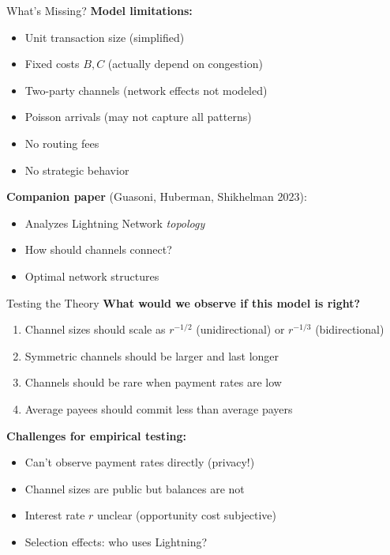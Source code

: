 \documentclass[aspectratio=169,12pt]{beamer}
\begin{document}
\begin{frame}{What's Missing?}
\textbf{Model limitations:}
\begin{itemize}
    \item Unit transaction size (simplified)
    \item Fixed costs $B, C$ (actually depend on congestion)
    \item Two-party channels (network effects not modeled)
    \item Poisson arrivals (may not capture all patterns)
    \item No routing fees
    \item No strategic behavior
\end{itemize}

\vspace{0.5cm}
\textbf{Companion paper} (Guasoni, Huberman, Shikhelman 2023):
\begin{itemize}
    \item Analyzes Lightning Network \textit{topology}
    \item How should channels connect?
    \item Optimal network structures
\end{itemize}
\end{frame}

\begin{frame}{Testing the Theory}
\textbf{What would we observe if this model is right?}

\begin{enumerate}
    \item Channel sizes should scale as $r^{-1/2}$ (unidirectional) or $r^{-1/3}$ (bidirectional)
    \item Symmetric channels should be larger and last longer
    \item Channels should be rare when payment rates are low
    \item Average payees should commit less than average payers
\end{enumerate}

\vspace{0.5cm}
\textbf{Challenges for empirical testing:}
\begin{itemize}
    \item Can't observe payment rates directly (privacy!)
    \item Channel sizes are public but balances are not
    \item Interest rate $r$ unclear (opportunity cost subjective)
    \item Selection effects: who uses Lightning?
\end{itemize}
\end{frame}
\end{document}
